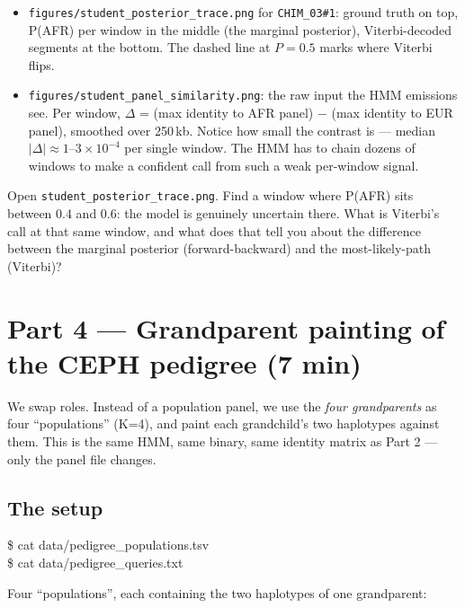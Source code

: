 \documentclass[11pt]{article}
\begin{document}
\begin{itemize}\setlength{\itemsep}{0.2em}
  \item \texttt{figures/student\_posterior\_trace.png} for
    \texttt{CHIM\_03\#1}: ground truth on top, P(AFR) per window in
    the middle (the marginal posterior), Viterbi-decoded segments at
    the bottom. The dashed line at $P=0.5$ marks where Viterbi flips.
  \item \texttt{figures/student\_panel\_similarity.png}: the raw
    input the HMM emissions see. Per window, $\Delta$ = (max identity
    to AFR panel) $-$ (max identity to EUR panel), smoothed over
    250\,kb. Notice how small the contrast is --- median $|\Delta|
    \approx 1$--$3 \times 10^{-4}$ per single window. The HMM has to
    chain dozens of windows to make a confident call from such a
    weak per-window signal.
\end{itemize}

\begin{quest}[3.4]
Open \texttt{student\_posterior\_trace.png}. Find a window where
P(AFR) sits between 0.4 and 0.6: the model is genuinely uncertain
there. What is Viterbi's call at that same window, and what does
that tell you about the difference between the marginal posterior
(forward-backward) and the most-likely-path (Viterbi)?
\end{quest}

\section{Part 4 --- Grandparent painting of the CEPH pedigree (7 min)}

We swap roles. Instead of a population panel, we use the \emph{four
grandparents} as four ``populations'' (K=4), and paint each
grandchild's two haplotypes against them. This is the same HMM, same
binary, same identity matrix as Part 2 --- only the panel file changes.

\subsection*{The setup}

\begin{cmd}
\$ cat data/pedigree\_populations.tsv \\
\$ cat data/pedigree\_queries.txt
\end{cmd}

Four ``populations'', each containing the two haplotypes of one
grandparent:
\end{document}
